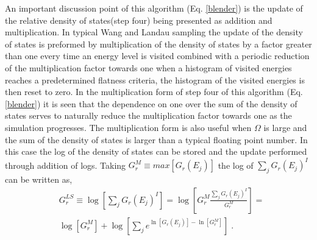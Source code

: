 \documentclass[aps,pre,reprint,superscriptaddress,showkeys]{revtex4-1}
\begin{document}
 

An important discussion point of this algorithm (Eq. \ref{blender}) is the update of the relative density of states(step four) being presented as addition and multiplication.
 In  typical Wang and Landau sampling the update of the density of states is preformed by multiplication of the density of states by a factor greater than one every time an energy level is visited combined with a periodic reduction of the multiplication factor towards one when a histogram of visited energies reaches a predetermined flatness criteria, the histogram of the visited energies is then reset to zero. In the multiplication form of step four of this algorithm (Eq. \ref{blender}) it is seen that the dependence on one over the sum of the density of states serves to naturally reduce the multiplication factor towards one as the simulation progresses. The multiplication form is also useful when $\Omega$ is large and the sum of the density of states is larger than a typical floating point number. In this case the log of the density of states can be stored and the update performed through addition of logs. Taking $G_{r}^M \equiv  max[G_{r}(E_j)]$ the log of $\sum_j G_r(E_j)^{I}$ can be written as, 
\begin{equation}
\begin{split}
&G_{r}^{LS} \equiv \log[\sum_j G_{r}(E_j)^{I}] = \log[G_{r}^M \frac{\sum_j G_{r}(E_j)^{I}}{G_{r}^M}]=\\
&\log[G_{r}^M] + \log[\sum_j e^{\ln[G_{r}(E_j)] - \ln[G_{r}^M]} ] \;.
\end{split}
\label{Hls}
\end{equation} 
\end{document}
